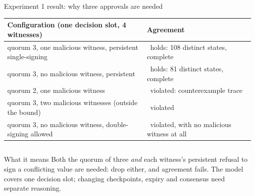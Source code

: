 \documentclass[aspectratio=169,10pt]{beamer}
\newcommand{\cmark}{\textcolor{okgreen}{\ding{51}}}
\newcommand{\xmark}{\textcolor{badred!80}{\ding{55}}}
\begin{document}
\begin{frame}{Experiment 1 result: why three approvals are needed}
\vspace{0.3em}
\footnotesize
\renewcommand{\arraystretch}{1.2}
\begin{tabular}{@{}L{0.42\textwidth} L{0.55\textwidth}@{}}
\toprule
\textbf{Configuration (one decision slot, 4 witnesses)} & \textbf{Agreement} \\
\midrule
quorum 3, one malicious witness, persistent single-signing & \cmark\ holds: 108 distinct states, complete \\
quorum 3, no malicious witness, persistent & \cmark\ holds: 81 distinct states, complete \\
quorum 2, one malicious witness & \xmark\ violated: counterexample trace \\
quorum 3, two malicious witnesses (outside the bound) & \xmark\ violated \\
quorum 3, no malicious witness, double-signing allowed & \xmark\ violated, with no malicious witness at all \\
\bottomrule
\end{tabular}

\vspace{0.5em}
\begin{columns}[T,onlytextwidth]
\begin{alertblock}{What it means}
\scriptsize Both the quorum of three \emph{and} each witness's persistent refusal to sign a conflicting value are needed: drop either, and agreement fails. The model covers one decision slot; changing checkpoints, expiry and consensus need separate reasoning.
\end{alertblock}
\end{columns}
\end{frame}
\end{document}
